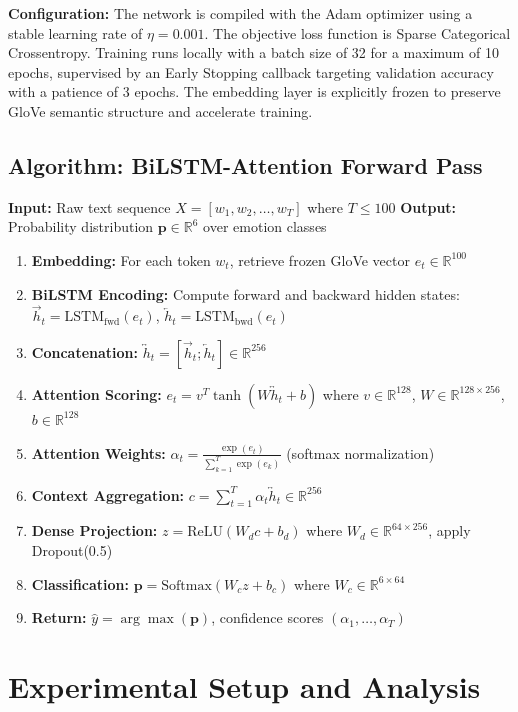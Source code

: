 \documentclass[conference]{IEEEtran}
\begin{document}
\textbf{Configuration:} The network is compiled with the Adam optimizer using a stable learning rate of $\eta = 0.001$. The objective loss function is Sparse Categorical Crossentropy. Training runs locally with a batch size of 32 for a maximum of 10 epochs, supervised by an Early Stopping callback targeting validation accuracy with a patience of 3 epochs. The embedding layer is explicitly frozen to preserve GloVe semantic structure and accelerate training.

\subsection{Algorithm: BiLSTM-Attention Forward Pass}
\textbf{Input:} Raw text sequence $X = [w_1, w_2, \ldots, w_T]$ where $T \leq 100$
\textbf{Output:} Probability distribution $\mathbf{p} \in \mathbb{R}^6$ over emotion classes
\begin{enumerate}
  \item \textbf{Embedding:} For each token $w_t$, retrieve frozen GloVe vector $e_t \in \mathbb{R}^{100}$
  \item \textbf{BiLSTM Encoding:} Compute forward and backward hidden states: $\overrightarrow{h}_t = \text{LSTM}_{\text{fwd}}(e_t)$, $\overleftarrow{h}_t = \text{LSTM}_{\text{bwd}}(e_t)$
  \item \textbf{Concatenation:} $\overleftrightarrow{h}_t = [\overrightarrow{h}_t; \overleftarrow{h}_t] \in \mathbb{R}^{256}$
  \item \textbf{Attention Scoring:} $e_t = v^T \tanh(W \overleftrightarrow{h}_t + b)$ where $v \in \mathbb{R}^{128}$, $W \in \mathbb{R}^{128 \times 256}$, $b \in \mathbb{R}^{128}$
  \item \textbf{Attention Weights:} $\alpha_t = \frac{\exp(e_t)}{\sum_{k=1}^T \exp(e_k)}$ (softmax normalization)
  \item \textbf{Context Aggregation:} $c = \sum_{t=1}^T \alpha_t \overleftrightarrow{h}_t \in \mathbb{R}^{256}$
  \item \textbf{Dense Projection:} $z = \text{ReLU}(W_d c + b_d)$ where $W_d \in \mathbb{R}^{64 \times 256}$, apply Dropout(0.5)
  \item \textbf{Classification:} $\mathbf{p} = \text{Softmax}(W_c z + b_c)$ where $W_c \in \mathbb{R}^{6 \times 64}$
  \item \textbf{Return:} $\hat{y} = \arg\max(\mathbf{p})$, confidence scores $(\alpha_1, \ldots, \alpha_T)$
\end{enumerate}

\section{Experimental Setup and Analysis}
\end{document}
